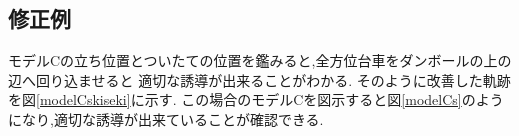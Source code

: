 \begin{comment}
\begin{figure}[htbp]
 \begin{minipage}{0.5\hsize}
\begin{center}
\texttt{[image: modelCfkiseki.eps]}
\caption{モデルCにおける適切でない誘導の軌跡}
\label{modelCfkiseki}
\end{center}
 \end{minipage}
 \begin{minipage}{0.5\hsize}
\begin{center}
\texttt{[image: modelCf.eps]}
\caption{モデルCの図示(適切でない例)}
\label{modelCf}
\end{center}
 \end{minipage}
\end{figure}
\end{comment}

\subsection{修正例}
モデルCの立ち位置とついたての位置を鑑みると,全方位台車をダンボールの上の辺へ回り込ませると
適切な誘導が出来ることがわかる.
そのように改善した軌跡を図\ref{modelCskiseki}に示す.
この場合のモデルCを図示すると図\ref{modelCs}のようになり,適切な誘導が出来ていることが確認できる.


\begin{comment}
\begin{figure}[htbp]
 \begin{minipage}{0.5\hsize}
\begin{center}
\texttt{[image: modelCskiseki.eps]}
\caption{モデルCにおける適切な誘導の軌跡}
\label{modelCskiseki}
\end{center}
 \end{minipage}
 \begin{minipage}{0.5\hsize}
\begin{center}
\texttt{[image: modelCs.eps]}
\caption{モデルCの図示(適切な例)}
\label{modelCs}
\end{center}
 \end{minipage}
\end{figure}
\end{comment}